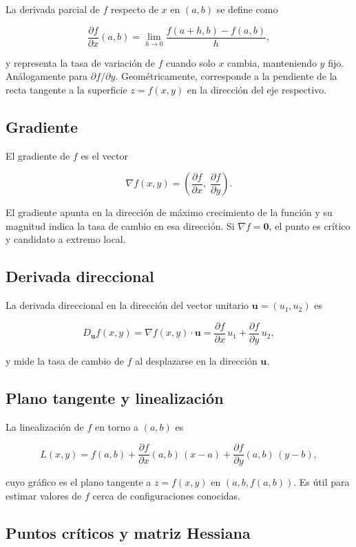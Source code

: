 \documentclass[12pt,a4paper]{article}
\begin{document}
La derivada parcial de $f$ respecto de $x$ en $(a,b)$ se define como

\[
\frac{\partial f}{\partial x}(a,b) = \lim_{h\to 0} \frac{f(a+h,b)-f(a,b)}{h},
\]

y representa la tasa de variación de $f$ cuando solo $x$ cambia, manteniendo $y$ fijo. Análogamente para $\partial f/\partial y$. Geométricamente, corresponde a la pendiente de la recta tangente a la superficie $z=f(x,y)$ en la dirección del eje respectivo.

\subsection{Gradiente}

El gradiente de $f$ es el vector

\[
\nabla f(x,y) = \left( \frac{\partial f}{\partial x},\; \frac{\partial f}{\partial y} \right).
\]

El gradiente apunta en la dirección de máximo crecimiento de la función y su magnitud indica la tasa de cambio en esa dirección. Si $\nabla f = \mathbf{0}$, el punto es crítico y candidato a extremo local.

\subsection{Derivada direccional}

La derivada direccional en la dirección del vector unitario $\mathbf{u}=(u_1,u_2)$ es

\[
D_{\mathbf{u}} f(x,y) = \nabla f(x,y)\cdot\mathbf{u}
= \frac{\partial f}{\partial x}\,u_1 + \frac{\partial f}{\partial y}\,u_2,
\]

y mide la tasa de cambio de $f$ al desplazarse en la dirección $\mathbf{u}$.

\subsection{Plano tangente y linealización}

La linealización de $f$ en torno a $(a,b)$ es

\[
L(x,y) = f(a,b) + \frac{\partial f}{\partial x}(a,b)\,(x-a) + \frac{\partial f}{\partial y}(a,b)\,(y-b),
\]

cuyo gráfico es el plano tangente a $z=f(x,y)$ en $(a,b,f(a,b))$. Es útil para estimar valores de $f$ cerca de configuraciones conocidas.

\subsection{Puntos críticos y matriz Hessiana}
\end{document}
